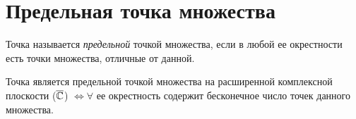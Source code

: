 \section{Предельная точка множества}

\begin{definition}
	Точка называется \emph{предельной} точкой множества, если в любой ее окрестности есть точки множества, отличные от данной.
\end{definition}

\begin{remark}
	Точка является предельной точкой множества на расширенной комплексной плоскости ($\overline{\mathbb{C}}$) $\iff \forall $ ее окрестность содержит бесконечное число точек данного множества.
\end{remark}
